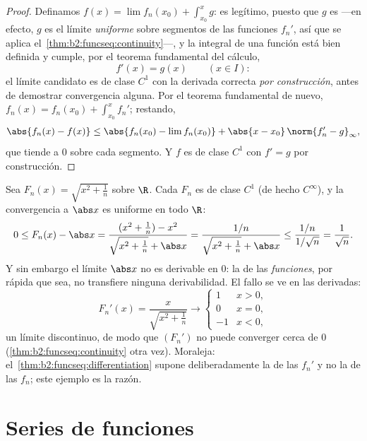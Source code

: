 \begin{proof}
Definamos $f(x) = \lim f_n(x_0) + \int_{x_0}^x g$: es legítimo,
puesto que $g$ es  ---en efecto, $g$ es el límite
\emph{uniforme} sobre segmentos de las funciones  $f_n'$,
así que se aplica el~\cref{thm:b2:funcseq:continuity}---, y la
integral de una función  está bien definida y cumple, por el
teorema fundamental del cálculo,
\[
f'(x) = g(x) \qquad (x \in I) :
\]
el límite candidato es de clase $C^1$ con la derivada correcta
\emph{por construcción}, antes de demostrar convergencia alguna. Por
el teorema fundamental de nuevo, $f_n(x) = f_n(x_0) + \int_{x_0}^x
f_n'$; restando,
\[
\abs{f_n(x) - f(x)} \leq \abs{f_n(x_0) - \lim f_n(x_0)}
+ \abs{x - x_0}\,\norm{f_n' - g}_{\infty} ,
\]
que tiende a $0$  sobre cada segmento. Y $f$ es de
clase $C^1$ con $f' = g$ por construcción.
\end{proof}

\begin{example}\label{ex:b2:funcseq:sqrtabs}
Sea $F_n(x) = \sqrt{x^2 + \frac1n}$ sobre $\R$. Cada $F_n$ es de
clase $C^1$ (de hecho $C^\infty$), y la convergencia a $\abs x$ es
uniforme en todo $\R$:
\[
0 \leq F_n(x) - \abs x
= \frac{(x^2 + \frac1n) - x^2}{\sqrt{x^2+\frac1n} + \abs x}
= \frac{1/n}{\sqrt{x^2 + \frac1n} + \abs x}
\leq \frac{1/n}{1/\sqrt n} = \frac{1}{\sqrt n} .
\]
Y sin embargo el límite $\abs x$ no es derivable en $0$: la
 de las \emph{funciones}, por rápida que sea, no
transfiere ninguna derivabilidad. El fallo se ve en las derivadas:
\[
F_n'(x) = \frac{x}{\sqrt{x^2 + \frac1n}}
\longrightarrow \begin{cases} 1 & x > 0,\\ 0 & x = 0,\\
-1 & x < 0, \end{cases}
\]
un límite  discontinuo, de modo que $(F_n')$ no puede
converger  cerca de $0$
(\cref{thm:b2:funcseq:continuity} otra vez). Moraleja: el~\cref{thm:b2:funcseq:differentiation} supone deliberadamente la
 de las $f_n'$ y no la de las $f_n$; este
ejemplo es la razón.
\end{example}

\section{Series de funciones}

